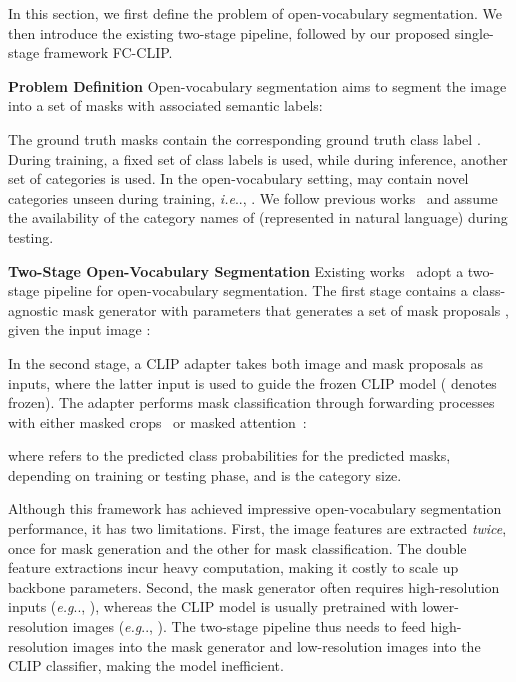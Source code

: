 \documentclass{article}
\makeatletter
\DeclareRobustCommand\onedot{\futurelet\@let@token\@onedot}
\def\@onedot{\ifx\@let@token.\else.\null\fi\xspace}
\def\eg{\emph{e.g}\onedot}
\def\ie{\emph{i.e}\onedot}
\newcommand{\modelname}{FC-CLIP\xspace}
\makeatother
\begin{document}
In this section, we first define the problem of open-vocabulary segmentation.
We then introduce the existing two-stage pipeline, followed by our proposed single-stage framework \modelname.


\noindent \textbf{Problem Definition}\quad
Open-vocabulary segmentation aims to segment the image  into 
a set of masks with associated semantic labels:



The  ground truth masks  contain the corresponding ground truth class label .
During training, a fixed set of class labels  is used, while during inference, another set of categories  is used.
In the open-vocabulary setting,  may contain novel categories unseen during training, \ie, .
We follow previous works~\cite{ding2022open, xu2023open} and assume the availability of the category names of  (represented in natural language) during testing.

\noindent \textbf{Two-Stage Open-Vocabulary Segmentation}\quad
Existing works~\cite{xu2021simple, liang2022open, ding2022open, xu2023open} adopt a two-stage pipeline for open-vocabulary segmentation.
The first stage contains a class-agnostic mask generator  with parameters  that generates a set of  mask proposals 
, given the input image :


In the second stage, a CLIP adapter  takes both image  and mask proposals  as inputs, where the latter input is used to guide the frozen CLIP model  ( denotes frozen).
The adapter performs mask classification through forwarding processes with either masked crops~\cite{xu2021simple, liang2022open} or masked attention~\cite{ding2022open, xu2023open}:

where  refers to the predicted class probabilities for the  predicted masks,  depending on training or testing phase, and  is the category size.

Although this framework has achieved impressive open-vocabulary segmentation performance, it has two limitations.
First, the image features are extracted \textit{twice}, once for mask generation and the other for mask classification.
The double feature extractions incur heavy computation, making it costly to scale up backbone parameters.
Second, the mask generator often requires high-resolution inputs (\eg, ), whereas the CLIP model is usually pretrained with lower-resolution images (\eg, ).
The two-stage pipeline thus needs to feed high-resolution images into the mask generator and low-resolution images into the CLIP classifier, making the model inefficient.
\end{document}
